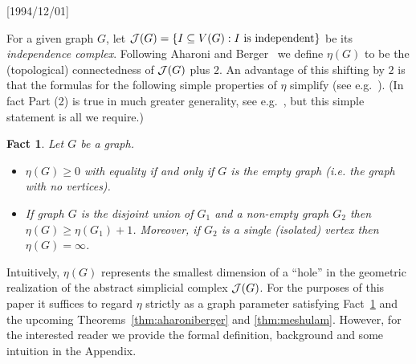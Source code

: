 \NeedsTeXFormat{LaTeX2e}[1994/12/01]\documentclass[letterpaper, 11pt]{article}
\newtheorem{fact}{Fact}
\theoremstyle{definition}
\theoremstyle{remark}
\numberwithin{equation}{section}
\begin{document}
For a given graph $G$, let ${\cal J}(G) = \{ I \subseteq V(G) :
\mbox{$I$ is independent}\}$ be its {\em independence complex}. 
Following Aharoni and Berger~\cite{aharoniberger} we define $\eta(G)$
to be the (topological) connectedness of ${\cal J}(G)$ plus
$2$.  An advantage of this shifting by $2$
is that the formulas for the following simple properties of $\eta$
simplify (see e.g.~\cite{adamaszekbarmak, aharoniberger,
  aharonibergerziv}). (In fact Part (2) is true in much greater
generality, see e.g.~\cite{aharoniberger}, but this simple statement is all we require.)
\begin{fact} \label{fact:eta} Let $G$ be a graph.
  \begin{itemize}
  \item[(1)] $\eta (G) \geq 0$ with equality if and only if $G$ is the
    empty graph (i.e. the graph with no vertices).
  \item[(2)] If graph $G$ is the disjoint union of $G_1$ and a
    non-empty graph $G_2$ then $\eta (G) \geq \eta (G_1) + 1$. Moreover, if
    $G_2$ is a single (isolated) vertex then $\eta (G) = \infty$.
      \end {itemize}
    \end{fact}
Intuitively, $\eta (G)$ represents the smallest dimension of a
``hole'' in the geometric realization of the abstract simplicial complex
${\cal J}(G)$. For the purposes of this paper it suffices to regard
$\eta$ strictly as a graph parameter satisfying Fact~\ref{fact:eta} and
the upcoming Theorems~\ref{thm:aharoniberger} and \ref{thm:meshulam}.
However, for the interested reader we provide the formal
definition, background and some intuition in the Appendix. 
    
\end{document}
